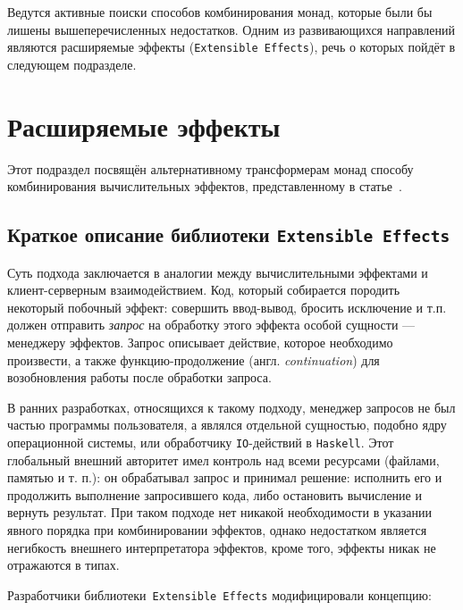Ведутся активные поиски способов комбинирования монад, которые были бы лишены вышеперечисленных недостатков. Одним из развивающихся направлений являются расширяемые эффекты (\lstinline{Extensible Effects}), речь о которых пойдёт в следующем подразделе.

\section{Расширяемые эффекты}

Этот подраздел посвящён альтернативному трансформерам монад способу 
комбинирования вычислительных эффектов, 
представленному в статье~\autocite{ExtEffects}.

\subsection{Краткое описание библиотеки \lstinline{Extensible Effects}}

Суть подхода заключается в аналогии между вычислительными эффектами и 
клиент-серверным взаимодействием. Код, который собирается породить некоторый 
побочный эффект: совершить ввод-вывод, бросить исключение и т.п. должен 
отправить \emph{запрос} на обработку этого эффекта особой сущности --- менеджеру 
эффектов. Запрос описывает действие, которое необходимо произвести, а также 
функцию-продолжение (англ. \emph{continuation}) для возобновления работы после
обработки запроса.

В ранних разработках, относящихся к такому подходу, менеджер запросов не был 
частью программы пользователя, а являлся отдельной сущностью, подобно ядру 
операционной системы, или обработчику \lstinline{IO}-действий в 
\lstinline{Haskell}. Этот глобальный внешний авторитет имел контроль над всеми
ресурсами (файлами, памятью и т. п.): он обрабатывал запрос и принимал решение: 
исполнить его и продолжить выполнение запросившего кода, либо остановить 
вычисление и вернуть результат. При таком подходе нет никакой необходимости в
указании явного порядка при комбинировании эффектов, однако недостатком является
негибкость внешнего интерпретатора эффектов, кроме того, эффекты никак 
не отражаются в типах.

Разработчики библиотеки~\lstinline{Extensible Effects} модифицировали концепцию:

